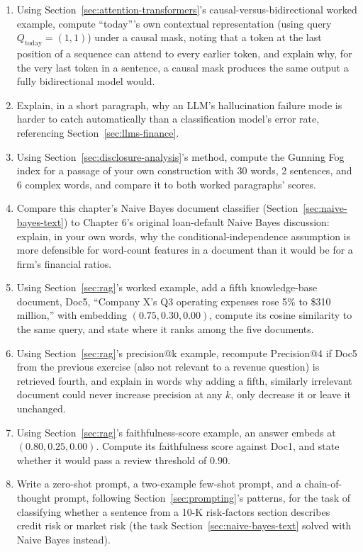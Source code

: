 \documentclass[../ai_in_finance]{subfiles}
\begin{document}
\begin{enumerate}
    \item Using Section~\ref{sec:attention-transformers}'s causal-versus-bidirectional worked example, compute ``today'''s own contextual representation (using query $Q_{\text{today}} = (1,1)$) under a causal mask, noting that a token at the last position of a sequence can attend to every earlier token, and explain why, for the very last token in a sentence, a causal mask produces the same output a fully bidirectional model would.
    \item Explain, in a short paragraph, why an LLM's hallucination failure mode is harder to catch automatically than a classification model's error rate, referencing Section~\ref{sec:llms-finance}.
    \item Using Section~\ref{sec:disclosure-analysis}'s method, compute the Gunning Fog index for a passage of your own construction with 30 words, 2 sentences, and 6 complex words, and compare it to both worked paragraphs' scores.
    \item Compare this chapter's Naive Bayes document classifier (Section~\ref{sec:naive-bayes-text}) to Chapter 6's original loan-default Naive Bayes discussion: explain, in your own words, why the conditional-independence assumption is more defensible for word-count features in a document than it would be for a firm's financial ratios.
    \item Using Section~\ref{sec:rag}'s worked example, add a fifth knowledge-base document, Doc5, ``Company X's Q3 operating expenses rose 5\% to \$310 million,'' with embedding $(0.75, 0.30, 0.00)$, compute its cosine similarity to the same query, and state where it ranks among the five documents.
    \item Using Section~\ref{sec:rag}'s precision@k example, recompute Precision@4 if Doc5 from the previous exercise (also not relevant to a revenue question) is retrieved fourth, and explain in words why adding a fifth, similarly irrelevant document could never increase precision at any $k$, only decrease it or leave it unchanged.
    \item Using Section~\ref{sec:rag}'s faithfulness-score example, an answer embeds at $(0.80, 0.25, 0.00)$. Compute its faithfulness score against Doc1, and state whether it would pass a review threshold of $0.90$.
    \item Write a zero-shot prompt, a two-example few-shot prompt, and a chain-of-thought prompt, following Section~\ref{sec:prompting}'s patterns, for the task of classifying whether a sentence from a 10-K risk-factors section describes credit risk or market risk (the task Section~\ref{sec:naive-bayes-text} solved with Naive Bayes instead).

\end{enumerate}
\end{document}
